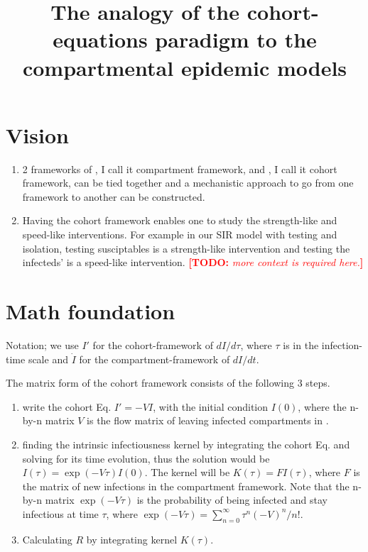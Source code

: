 \documentclass[12pt]{article}
\title{The analogy of the cohort-equations paradigm to the compartmental epidemic models}
\newcommand{\todo}[1]{\comment{red}{TODO}{#1}}
\newcommand{\comment}{\showcomment}
\newcommand{\showcomment}[3]{\textcolor{#1}{\textbf{[#2: }\textsl{#3}\textbf{]}}}
\theoremstyle{definition} %
\begin{document}
\maketitle
\linenumbers
\section{Vision}
\begin{enumerate}
\item 2 frameworks of \cite{van2002reproduction}, I call it compartment framework, and \cite{champredon2018equivalence}, I call it cohort framework, can be tied together and a mechanistic approach to go from one framework to another can be constructed.

\item Having the cohort framework enables one to study the strength-like and speed-like interventions. For example in our SIR model with testing and isolation, testing susciptables is a strength-like intervention and testing the infecteds' is a speed-like intervention. \todo{more context is required here.}
\end{enumerate}

\section{Math foundation}
Notation; we use $I'$ for the cohort-framework of $dI/d\tau$, where $\tau$ is in the infection-time scale and $\dot I$ for the compartment-framework of $dI/dt$. 

The matrix form of the cohort framework consists of the following 3 steps.
\begin{enumerate}[step 1]
\item
write the cohort Eq. $I'=-V I$, with the initial condition $I(0)$, where the n-by-n matrix $V$ is the flow matrix of leaving infected compartments in \cite{van2002reproduction}.

\item 
finding the intrinsic infectiousness kernel by integrating the cohort Eq. and solving for its time evolution, thus
the solution would be $I(\tau) = \exp(-V\tau) I(0)$. The kernel will be 
$K(\tau) = F I(\tau)$, where $F$ is the matrix of new infections in the compartment framework.
Note that the n-by-n matrix $\exp(-V\tau)$ is the probability of being infected and stay infectious at time $\tau$, where
$\exp(-V\tau)=\sum_{n=0}^\infty \tau^n (-V)^n/n!$.

\item
Calculating $R$ by integrating kernel $K(\tau)$.
\end{enumerate}
\end{document}
